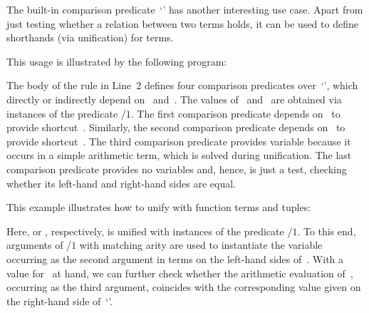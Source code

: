 The built-in comparison predicate~`\code{=}' has another interesting use case. 
Apart from just testing whether a relation between two terms holds,
it can be used to define shorthands (via unification) for terms.

\begin{example}\label{ex:define}
This usage is illustrated by the following program:%
%
%

%
The body of the rule in Line~2 defines four comparison predicates over~`\code{=}',
which directly or indirectly depend on~ and~.
The values of~ and~ are obtained via instances of the predicate /$1$.
The first comparison predicate depends on~ to provide shortcut~.
Similarly, the second comparison predicate depends on~ to provide shortcut~.
The third comparison predicate provides variable  because it occurs in a simple arithmetic term,
which is solved during unification.
The last comparison predicate provides no variables and,
hence, is just a test,
checking whether its left-hand and right-hand sides are equal.
\end{example}

\begin{example}\label{ex:unify}
This example illustrates how to unify with function terms and tuples:
%

%
Here,  or
, respectively,
is unified with instances of the predicate /$1$.
To this end,
arguments of /$1$ with matching arity
are used to instantiate the variable~ occurring
as the second argument in terms on the left-hand sides of~\code{=}.
With a value for~ at hand,
we can further check whether the arithmetic evaluation of~,
occurring as the third argument, coincides with the
corresponding value given on the right-hand side of~`\code{=}'.
%
\end{example}

